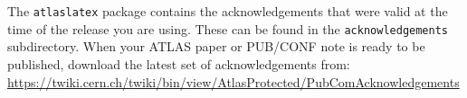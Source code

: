 \documentclass[11pt,twoside]{book}
\begin{document}
%

The \texttt{atlaslatex} package contains the acknowledgements that were valid 
at the time of the release you are using.
These can be found in the \texttt{acknowledgements} subdirectory.
When your ATLAS paper or PUB/CONF note is ready to be published,
download the latest set of acknowledgements from:\\
\url{https://twiki.cern.ch/twiki/bin/view/AtlasProtected/PubComAcknowledgements}


% 

%

% 
\end{document}
